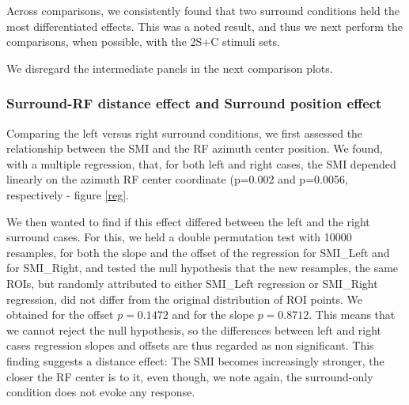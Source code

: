 Across comparisons, we consistently found that two surround conditions held the most differentiated effects. This was a noted result, and thus we next perform the comparisons, when possible, with the 2S+C stimuli sets.

We disregard the intermediate panels in the next comparison plots. 

\subsubsection{Surround-RF distance effect and Surround position effect}



%

Comparing the left versus right surround conditions, we first assessed the relationship between the SMI and the RF azimuth center position. We found, with a multiple regression, that, for both left and right cases, the SMI depended linearly on the azimuth RF center coordinate (p=0.002 and p=0.0056, respectively - figure \ref{reg}.

We then wanted to find if this effect differed between the left and the right surround cases. For this, we held a double permutation test with 10000 resamples, for both the slope and the offset of the regression for SMI_{Left} and for SMI_{Right}, and tested the null hypothesis that the new resamples, the same ROIs, but randomly attributed to either SMI_{Left} regression or SMI_{Right} regression, did not differ from the original distribution of ROI points. We obtained for the offset $p=0.1472$ and for the slope $p=0.8712$. This means that we cannot reject the null hypothesis, so the differences between left and right cases regression slopes and offsets are thus regarded as non significant. This finding suggests a distance effect: The SMI becomes increasingly stronger, the closer the RF center is to it, even though, we note again, the surround-only condition does not evoke any response. 


